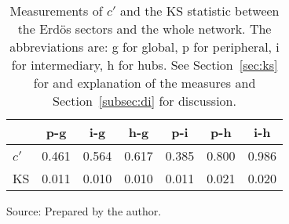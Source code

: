 \begin{table}[h!]
\begin{center}
\caption{Measurements of $c'$ and the KS statistic between the Erd\"os sectors and the whole network. The abbreviations are: g for global, p for peripheral, i for intermediary, h for hubs. See Section~\ref{sec:ks} for and explanation of the measures and Section~\ref{subsec:di} for discussion.}
\begin{tabular}{| l || c | c | c | c | c | c |}\hline
{\bf } & {\bf p-g} & {\bf i-g} & {\bf h-g} & {\bf p-i} & {\bf p-h} & {\bf i-h} \\\hline\hline
$c'$ & 0.461  & 0.564  & 0.617  & 0.385  & 0.800  & 0.986 \\
KS & 0.011  & 0.010  & 0.010  & 0.011  & 0.021  & 0.020 \\\hline
\end{tabular}
\begin{flushleft}
Source: Prepared by the author.\
\end{flushleft}
\end{center}
\end{table}
